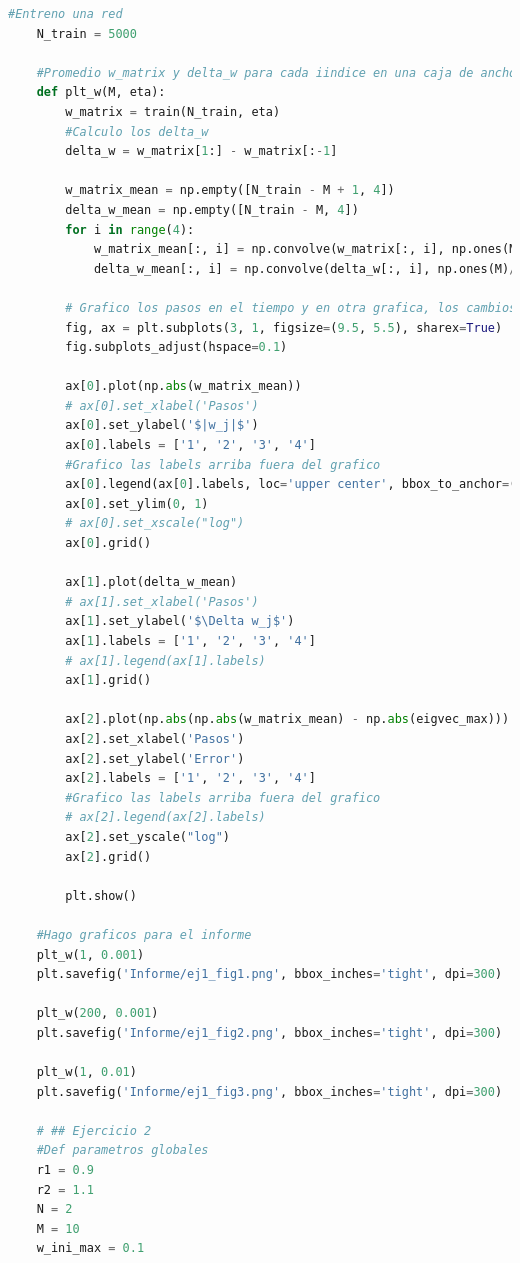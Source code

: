 \documentclass[aps,prb,twocolumn,superscriptaddress,floatfix,longbibliography]{revtex4-2}
\newcounter{para}
\begin{document}
\begin{lstlisting}[language=Python]
    #Entreno una red
    N_train = 5000
    
    #Promedio w_matrix y delta_w para cada iindice en una caja de ancho M con np.convolve
    def plt_w(M, eta):
        w_matrix = train(N_train, eta)
        #Calculo los delta_w
        delta_w = w_matrix[1:] - w_matrix[:-1]
    
        w_matrix_mean = np.empty([N_train - M + 1, 4])
        delta_w_mean = np.empty([N_train - M, 4])
        for i in range(4):
            w_matrix_mean[:, i] = np.convolve(w_matrix[:, i], np.ones(M)/M, mode='valid')
            delta_w_mean[:, i] = np.convolve(delta_w[:, i], np.ones(M)/M, mode='valid')
    
        # Grafico los pasos en el tiempo y en otra grafica, los cambios delta w_j entre pasos
        fig, ax = plt.subplots(3, 1, figsize=(9.5, 5.5), sharex=True)
        fig.subplots_adjust(hspace=0.1)
    
        ax[0].plot(np.abs(w_matrix_mean))
        # ax[0].set_xlabel('Pasos')
        ax[0].set_ylabel('$|w_j|$')
        ax[0].labels = ['1', '2', '3', '4']
        #Grafico las labels arriba fuera del grafico
        ax[0].legend(ax[0].labels, loc='upper center', bbox_to_anchor=(0.5, 1.3), ncol=4)
        ax[0].set_ylim(0, 1)
        # ax[0].set_xscale("log")
        ax[0].grid()
    
        ax[1].plot(delta_w_mean)
        # ax[1].set_xlabel('Pasos')
        ax[1].set_ylabel('$\Delta w_j$')
        ax[1].labels = ['1', '2', '3', '4']
        # ax[1].legend(ax[1].labels)
        ax[1].grid()
    
        ax[2].plot(np.abs(np.abs(w_matrix_mean) - np.abs(eigvec_max)))
        ax[2].set_xlabel('Pasos')
        ax[2].set_ylabel('Error')
        ax[2].labels = ['1', '2', '3', '4']
        #Grafico las labels arriba fuera del grafico
        # ax[2].legend(ax[2].labels)
        ax[2].set_yscale("log")
        ax[2].grid()
    
        plt.show()
    
    #Hago graficos para el informe
    plt_w(1, 0.001)
    plt.savefig('Informe/ej1_fig1.png', bbox_inches='tight', dpi=300)
    
    plt_w(200, 0.001)
    plt.savefig('Informe/ej1_fig2.png', bbox_inches='tight', dpi=300)
    
    plt_w(1, 0.01)
    plt.savefig('Informe/ej1_fig3.png', bbox_inches='tight', dpi=300)
    
    # ## Ejercicio 2
    #Def parametros globales
    r1 = 0.9
    r2 = 1.1
    N = 2
    M = 10
    w_ini_max = 0.1
    

\end{lstlisting}
\end{document}
